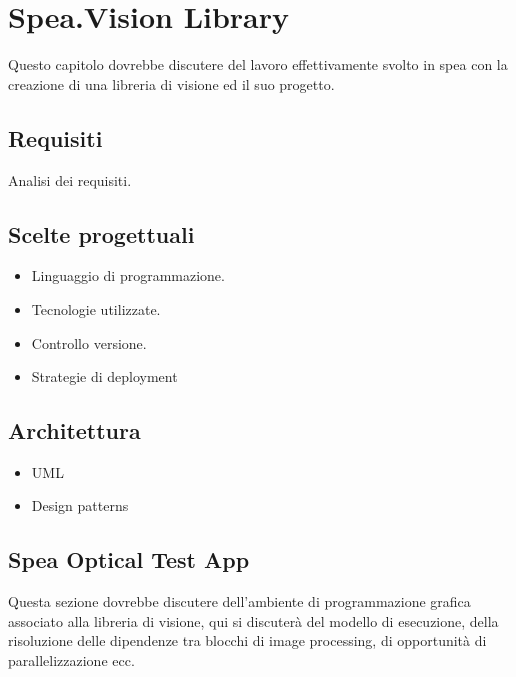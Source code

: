 \chapter{Spea.Vision Library}
Questo capitolo dovrebbe discutere del lavoro effettivamente
svolto in spea con la creazione di una libreria di visione
ed il suo progetto.

\section{Requisiti}
Analisi dei requisiti.

\section{Scelte progettuali}

\begin{itemize}
\item Linguaggio di programmazione.
\item Tecnologie utilizzate.
\item Controllo versione.
\item Strategie di deployment
\end{itemize}

\section{Architettura}

\begin{itemize}
\item UML
\item Design patterns
\end{itemize}

\section{Spea Optical Test App}
Questa sezione dovrebbe discutere dell'ambiente di programmazione
grafica associato alla libreria di visione, qui si discuterà del
modello di esecuzione, della risoluzione delle dipendenze tra blocchi
di image processing, di opportunità di parallelizzazione ecc.